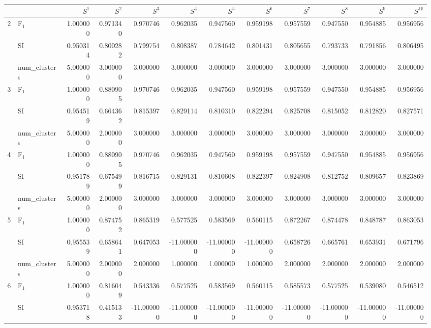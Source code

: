 \begin{tabular}{llrrrrrrrrrr}
\toprule
 &  & $S^{1}$ & $S^{2}$ & $S^{3}$ & $S^{4}$ & $S^{5}$ & $S^{6}$ & $S^{7}$ & $S^{8}$ & $S^{9}$ & $S^{10}$ \\
\midrule
\multirow[c]{3}{*}{2} & F$_1$ & 1.000000 & 0.971340 & 0.970746 & 0.962035 & 0.947560 & 0.959198 & 0.957559 & 0.947550 & 0.954885 & 0.956956 \\
 & SI & 0.950314 & 0.800282 & 0.799754 & 0.808387 & 0.784642 & 0.801431 & 0.805655 & 0.793733 & 0.791856 & 0.806495 \\
 & num_clusters & 5.000000 & 3.000000 & 3.000000 & 3.000000 & 3.000000 & 3.000000 & 3.000000 & 3.000000 & 3.000000 & 3.000000 \\
\multirow[c]{3}{*}{3} & F$_1$ & 1.000000 & 0.880905 & 0.970746 & 0.962035 & 0.947560 & 0.959198 & 0.957559 & 0.947550 & 0.954885 & 0.956956 \\
 & SI & 0.954519 & 0.664362 & 0.815397 & 0.829114 & 0.810310 & 0.822294 & 0.825708 & 0.815052 & 0.812820 & 0.827571 \\
 & num_clusters & 5.000000 & 2.000000 & 3.000000 & 3.000000 & 3.000000 & 3.000000 & 3.000000 & 3.000000 & 3.000000 & 3.000000 \\
\multirow[c]{3}{*}{4} & F$_1$ & 1.000000 & 0.880905 & 0.970746 & 0.962035 & 0.947560 & 0.959198 & 0.957559 & 0.947550 & 0.954885 & 0.956956 \\
 & SI & 0.951789 & 0.675499 & 0.816715 & 0.829131 & 0.810608 & 0.822397 & 0.824908 & 0.812752 & 0.809657 & 0.823869 \\
 & num_clusters & 5.000000 & 2.000000 & 3.000000 & 3.000000 & 3.000000 & 3.000000 & 3.000000 & 3.000000 & 3.000000 & 3.000000 \\
\multirow[c]{3}{*}{5} & F$_1$ & 1.000000 & 0.874752 & 0.865319 & 0.577525 & 0.583569 & 0.560115 & 0.872267 & 0.874478 & 0.848787 & 0.863053 \\
 & SI & 0.955539 & 0.658641 & 0.647053 & -11.000000 & -11.000000 & -11.000000 & 0.658726 & 0.665761 & 0.653931 & 0.671796 \\
 & num_clusters & 5.000000 & 2.000000 & 2.000000 & 1.000000 & 1.000000 & 1.000000 & 2.000000 & 2.000000 & 2.000000 & 2.000000 \\
\multirow[c]{3}{*}{6} & F$_1$ & 1.000000 & 0.816049 & 0.543336 & 0.577525 & 0.583569 & 0.560115 & 0.585573 & 0.577525 & 0.539080 & 0.546512 \\
 & SI & 0.953718 & 0.415133 & -11.000000 & -11.000000 & -11.000000 & -11.000000 & -11.000000 & -11.000000 & -11.000000 & -11.000000 \\

\end{tabular}
